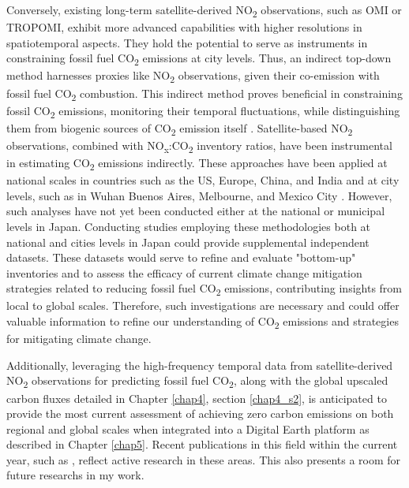 Conversely, existing long-term satellite-derived NO\textsubscript{2} observations, such as OMI or TROPOMI, exhibit more advanced capabilities with higher resolutions in spatiotemporal aspects. They hold the potential to serve as instruments in constraining fossil fuel CO\textsubscript{2} emissions at city levels. Thus, an indirect top-down method harnesses proxies like NO\textsubscript{2} observations, given their co-emission with fossil fuel CO\textsubscript{2} combustion. This indirect method proves beneficial in constraining fossil CO\textsubscript{2} emissions, monitoring their temporal fluctuations, while distinguishing them from biogenic sources of CO\textsubscript{2} emission itself \citep{ciais2014current, goldberg2019exploiting}. Satellite-based NO\textsubscript{2} observations, combined with NO\textsubscript{x}:CO\textsubscript{2} inventory ratios, have been instrumental in estimating CO\textsubscript{2} emissions indirectly. These approaches have been applied at national scales in countries such as the US, Europe, China, and India \citep{konovalov2016estimation, zheng2020satellite, miyazaki2023predictability} and at city levels, such as in Wuhan \citep{zhang2023quantifying} Buenos Aires, Melbourne, and Mexico City \citep{yang2023using}. However, such analyses have not yet been conducted either at the national or municipal levels in Japan. Conducting studies employing these methodologies both at national and cities levels in Japan could provide supplemental independent datasets. These datasets would serve to refine and evaluate "bottom-up" inventories and to assess the efficacy of current climate change mitigation strategies related to reducing fossil fuel CO\textsubscript{2} emissions, contributing insights from local to global scales. Therefore, such investigations are necessary and could offer valuable information to refine our understanding of CO\textsubscript{2} emissions and strategies for mitigating climate change. \par

Additionally, leveraging the high-frequency temporal data from satellite-derived NO\textsubscript{2} observations for predicting fossil fuel CO\textsubscript{2}, along with the global upscaled carbon fluxes detailed in Chapter \ref{chap4}, section \ref{chap4_s2}, is anticipated to provide the most current assessment of achieving zero carbon emissions on both regional and global scales when integrated into a Digital Earth platform as described in Chapter \ref{chap5}. Recent publications in this field within the current year, such as \citep{zhang2023quantifying, yang2023using, miyazaki2023predictability}, reflect active research in these areas. This also presents a room for future researchs in my work.\par